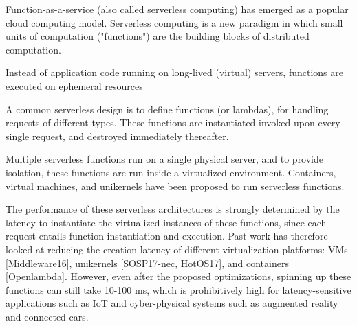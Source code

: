 Function-as-a-service (also called serverless computing) has emerged as a popular cloud computing model. 
%
Serverless computing is a new paradigm in which small units of computation ("functions") are the building blocks of distributed computation. 



Instead of application code running on long-lived (virtual) servers, functions are executed on ephemeral resources 







A common serverless design is to define functions (or lambdas), for handling requests of different types. 
These functions are instantiated invoked upon every single request, and destroyed immediately thereafter. 


Multiple serverless functions run on a single physical server, and to provide  isolation, these functions are run inside a virtualized environment. 
Containers, virtual machines, and unikernels have been proposed to run serverless functions. 


The performance of these serverless architectures is strongly determined by the latency to instantiate the virtualized instances of these functions, since each request entails function instantiation and execution. 
Past work has therefore looked at reducing the creation latency of different virtualization platforms: VMs [Middleware16], unikernels [SOSP17-nec, HotOS17], and containers [Openlambda]. 
However, even after the proposed optimizations, spinning up these functions can still take 10-100 ms, which is prohibitively high for latency-sensitive applications such as IoT and cyber-physical systems such as augmented reality and connected cars. 

